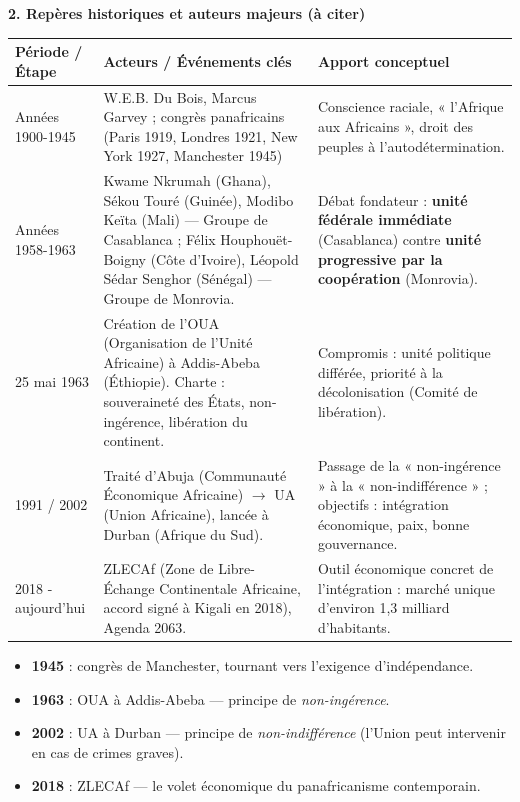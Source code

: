 \documentclass[11pt]{article}
\newcommand{\cle}[1]{{\popxbold\color{popdark}#1}}
\begin{document}
\textbf{2. Repères historiques et auteurs majeurs (à citer)}
\begin{center}
\begin{tabularx}{\linewidth}{|l|X|X|}
\hline
\rowcolor{popblueL}
\textbf{Période / Étape} & \textbf{Acteurs / Événements clés} & \textbf{Apport conceptuel} \\ \hline
Années 1900-1945 & W.E.B. Du Bois, Marcus Garvey ; congrès panafricains (Paris 1919, Londres 1921, New York 1927, Manchester 1945) & Conscience raciale, « l'Afrique aux Africains », droit des peuples à l'autodétermination. \\ \hline
Années 1958-1963 & Kwame Nkrumah (Ghana), Sékou Touré (Guinée), Modibo Keïta (Mali) — Groupe de Casablanca ; Félix Houphouët-Boigny (Côte d'Ivoire), Léopold Sédar Senghor (Sénégal) — Groupe de Monrovia. & Débat fondateur : \textbf{unité fédérale immédiate} (Casablanca) contre \textbf{unité progressive par la coopération} (Monrovia). \\ \hline
25 mai 1963 & Création de l'\cle{OUA} (Organisation de l'Unité Africaine) à Addis-Abeba (Éthiopie). Charte : souveraineté des États, non-ingérence, libération du continent. & Compromis : unité politique différée, priorité à la décolonisation (Comité de libération). \\ \hline
1991 / 2002 & Traité d'Abuja (Communauté Économique Africaine) $\to$ \cle{UA} (Union Africaine), lancée à Durban (Afrique du Sud). & Passage de la « non-ingérence » à la « non-indifférence » ; objectifs : intégration économique, paix, bonne gouvernance. \\ \hline
2018 - aujourd'hui & \cle{ZLECAf} (Zone de Libre-Échange Continentale Africaine, accord signé à Kigali en 2018), Agenda 2063. & Outil économique concret de l'intégration : marché unique d'environ 1,3 milliard d'habitants. \\ \hline
\end{tabularx}
\end{center}

\begin{aretenir}
\begin{itemize}
  \item \textbf{1945} : congrès de Manchester, tournant vers l'exigence d'indépendance.
  \item \textbf{1963} : OUA à Addis-Abeba — principe de \emph{non-ingérence}.
  \item \textbf{2002} : UA à Durban — principe de \emph{non-indifférence} (l'Union peut intervenir en cas de crimes graves).
  \item \textbf{2018} : ZLECAf — le volet économique du panafricanisme contemporain.
\end{itemize}
\end{aretenir}
\end{document}
